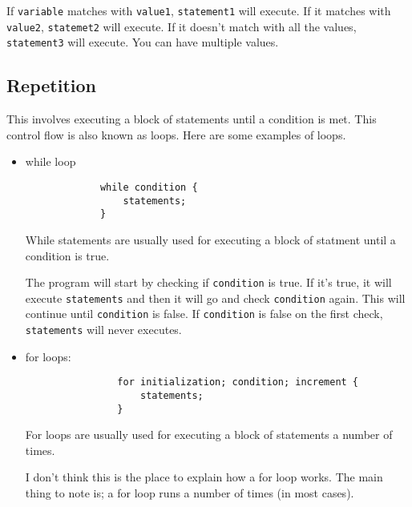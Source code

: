 \documentclass{book}
\begin{document}
If \verb|variable| matches with \verb|value1|, \verb|statement1| will execute. If it matches with \verb|value2|, \verb|statemet2| will execute. If it doesn't match with all the values, \verb|statement3| will execute. You can have multiple values.

\subsection{Repetition}
This involves executing a block of statements until a condition is met. This control flow is also known as loops. Here are some examples of loops.

\begin{itemize}
	\item while loop

		\begin{verbatim}
			 while condition {
				 statements;
			 }
		\end{verbatim}

		While statements are usually used for executing a block of statment until a condition is true.

		The program will start by checking if \verb|condition| is true. If it's true, it will execute \verb|statements| and then it will go and check \verb|condition| again. This will continue until \verb|condition| is false. If \verb|condition| is false on the first check, \verb|statements| will never executes.

	\item for loops:

		\begin{verbatim}
				for initialization; condition; increment {
					statements;
				}
		\end{verbatim}

For loops are usually used for executing a block of statements a number of times.

		I don't think this is the place to explain how a for loop works. The main thing to note is; a for loop runs a number of times (in most cases).
\end{itemize}
\end{document}
